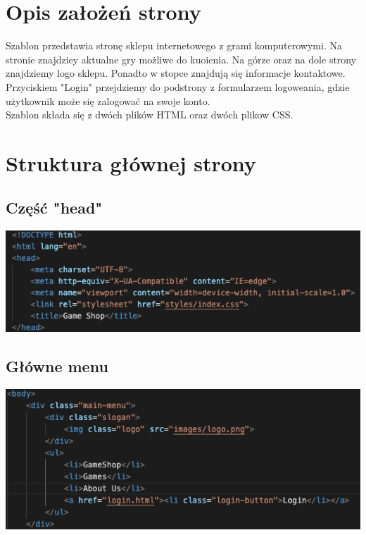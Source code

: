 \documentclass[12pt, letterpaper]{article}
\begin{document}
\section{Opis założeń strony}
\quad Szablon przedstawia stronę sklepu internetowego z grami komputerowymi. Na stronie znajdziey aktualne gry możliwe do kuoienia. Na górze oraz na dole strony znajdziemy logo sklepu. Ponadto w stopce znajdują się informacje kontaktowe. Przyciskiem "Login" przejdziemy do podstrony z formularzem logoweania, gdzie użytkownik może się zalogować na swoje konto.\\

Szablon składa się z dwóch plików HTML oraz dwóch plikow CSS.

\section{Struktura głównej strony}

\subsection{Część "head"}

\begin{center}
	\includegraphics[scale=0.5]{head}
\end{center}

\subsection{Główne menu}

\begin{center}
	\includegraphics[scale=0.5]{menu}
\end{center}
\end{document}
